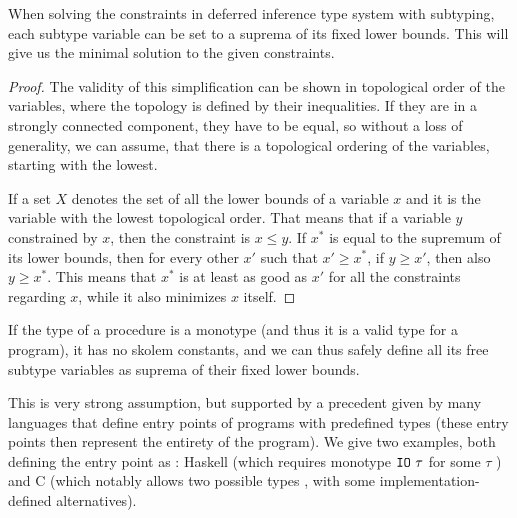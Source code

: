 \begin{lemma} When solving the constraints in deferred inference type system with subtyping, each subtype variable can be set to a suprema of its fixed lower bounds. This will give us the minimal solution to the given constraints.
    \label{suprema_subtyping}

    \begin{proof}
        The validity of this simplification can be shown in topological order of the variables, where the topology is defined by their inequalities. If they are in a strongly connected component, they have to be equal, so without a loss of generality, we can assume, that there is a topological ordering of the variables, starting with the lowest.

        If a set $X$ denotes the set of all the lower bounds of a variable $x$ and it is the variable with the lowest topological order. That means that if a variable $y$ constrained by $x$, then the constraint is $x \leq y$. If $x^\ast$ is equal to the supremum of its lower bounds, then for every other $x'$ such that $x' \geq x^\ast$, if $y \geq x'$, then also $y \geq x^\ast$. This means that $x^\ast$ is at least as good as $x'$ for all the constraints regarding $x$, while it also minimizes $x$ itself.
    \end{proof}

\end{lemma}

\begin{observe}
    If the type of a procedure is a monotype (and thus it is a valid type for a program), it has no skolem constants, and we can thus safely define all its free subtype variables as suprema of their fixed lower bounds.
\end{observe}

This is very strong assumption, but supported by a precedent given by many languages that define entry points of programs with predefined types (these entry points then represent the entirety of the program). We give two examples, both defining the entry point as : Haskell (which requires monotype $\mathtt{IO}\ \tau$ for some $\tau$ \cite{haskell2010}) and C (which notably allows two possible types \cite{cstandard2018}, with some implementation-defined alternatives).



